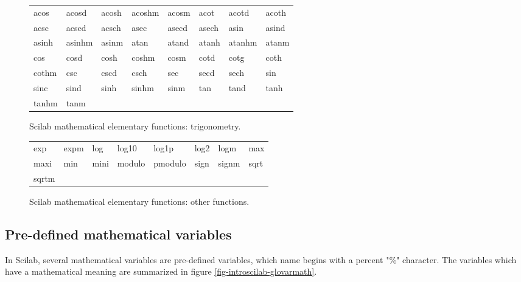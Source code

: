 \begin{figure}
\begin{center}
\begin{tabular}{|llllllll|}
\hline
    acos   &    acosd   &    acosh  &    acoshm  &    acosm  &    acot   &    acotd   &    acoth  \\
    acsc   &    acscd   &    acsch  &    asec    &    asecd  &    asech  &    asin    &    asind  \\
    asinh  &    asinhm  &    asinm  &    atan    &    atand  &    atanh  &    atanhm  &    atanm  \\
    cos    &    cosd    &    cosh   &    coshm   &    cosm   &    cotd   &    cotg    &    coth   \\
    cothm  &    csc     &    cscd   &    csch    &    sec    &    secd   &    sech    &    sin    \\
    sinc    &    sind   &    sinh   &    sinhm   &    sinm   &    tan    &    tand    &    tanh  \\
    tanhm  &    tanm  &&&&&&\\
\hline
\end{tabular}
\end{center}
\caption{Scilab mathematical elementary functions: trigonometry.}
\label{fig-introscilab-elemenfun1}
\end{figure}


\begin{figure}
\begin{center}
\begin{tabular}{|llllllll|}
\hline
    exp   &    expm  &    log   &    log10   &    log1p   &    log2  &    logm  &    max  \\
    maxi  &    min   &    mini  &    modulo  &    pmodulo &    sign  &    signm &    sqrt  \\
    sqrtm  & &&&&&&\\
\hline
\end{tabular}
\end{center}
\caption{Scilab mathematical elementary functions: other functions.}
\label{fig-introscilab-elemenfun2}
\end{figure}

\subsection{Pre-defined mathematical variables}
\label{introscilab-predefinedvars}

In Scilab, several mathematical variables are pre-defined variables, 
which name begins with a percent "\%" character.
The variables which have a mathematical meaning are 
summarized in figure \ref{fig-introscilab-glovarmath}.

